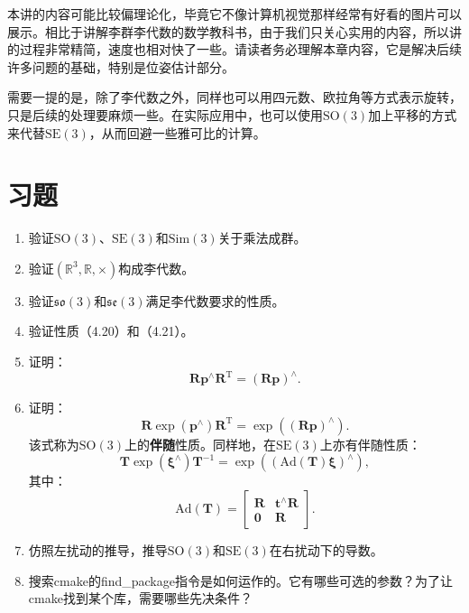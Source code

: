 本讲的内容可能比较偏理论化，毕竟它不像计算机视觉那样经常有好看的图片可以展示。相比于讲解李群李代数的数学教科书，由于我们只关心实用的内容，所以讲的过程非常精简，速度也相对快了一些。请读者务必理解本章内容，它是解决后续许多问题的基础，特别是位姿估计部分。

需要一提的是，除了李代数之外，同样也可以用四元数、欧拉角等方式表示旋转，只是后续的处理要麻烦一些。在实际应用中，也可以使用$\mathrm{SO}(3)$加上平移的方式来代替$\mathrm{SE}(3)$，从而回避一些雅可比的计算。

\section*{习题}
\begin{enumerate}
	\item 验证$\mathrm{SO}(3)$、$\mathrm{SE}(3)$和$\mathrm{Sim}(3)$关于乘法成群。
	\item 验证$( \mathbb{R}^3, \mathbb{R}, \times )$构成李代数。
	\item 验证$\mathfrak{so}(3)$和$\mathfrak{se}(3)$满足李代数要求的性质。
	\item 验证性质（4.20）和（4.21）。
	\item 证明：\[
	\bm{R} \bm{p}^\wedge \bm{R}^\mathrm{T} = (\bm{Rp})^\wedge .\]
	\item 证明：\[
	\bm{R} \exp( \bm{p}^\wedge) \bm{R}^\mathrm{T} = \exp( (\bm{Rp})^\wedge ).\] 该式称为$\mathrm{SO}(3)$上的\textbf{伴随}性质。同样地，在$\mathrm{SE}(3)$上亦有伴随性质：
	\begin{equation}
	\bm{T} \exp(\bm{\xi}^\wedge)\bm{T}^{-1} = \exp \left( \left( \mathrm{Ad}(\bm{T}) \bm{\xi} \right) ^\wedge \right),
	\end{equation}
	其中：
	\begin{equation}
	\label{eq:adjSE3}
	\mathrm{Ad} ( \bm{T} ) = \left[ {\begin{array}{*{20}{c}}
		\bm{R} &{{ \bm{t} ^ \wedge } \bm{R} }\\
		\bm{0} & \bm{R}
		\end{array}} \right]. 
	\end{equation}
	\item 仿照左扰动的推导，推导$\mathrm{SO}(3)$和$\mathrm{SE}(3)$在右扰动下的导数。
	\item 搜索cmake的find\_package指令是如何运作的。它有哪些可选的参数？为了让cmake找到某个库，需要哪些先决条件？
\end{enumerate}
